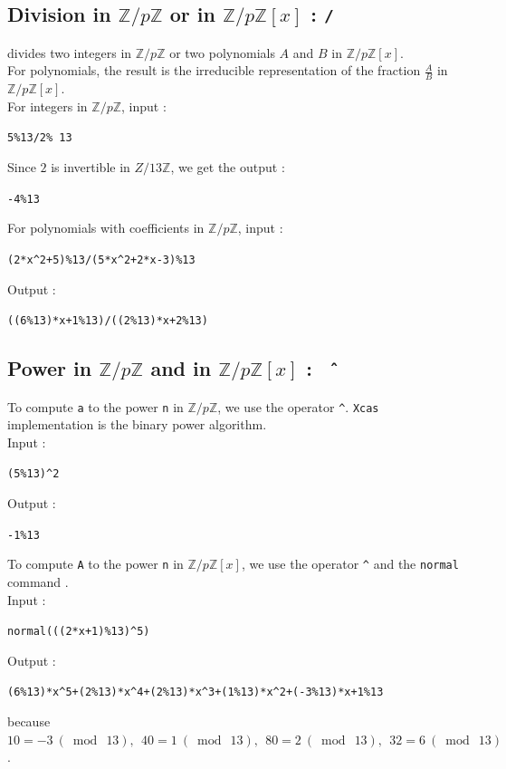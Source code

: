\documentclass[a4paper,11pt]{book}
\newcommand{\Z}{{\mathbb{Z}}}
\begin{document}
\subsection{Division in $\Z/p\Z$ or in $\Z/p\Z[x]$ : {\tt /}}\index{/}
\noindent{\tt /} divides two integers in $\Z/p\Z$ or 
two polynomials $A$ and $B$ in $\Z/p\Z[x]$.\\
For polynomials, the result is the irreducible representation
of the fraction $\frac{A}{B}$ in $\Z/p\Z[x]$.\\
For integers in $\Z/p\Z$, input :
\begin{center}{\tt 5\%13/2\% 13}\end{center}
Since $2$ is invertible in $Z/13\Z$, we get the output :
\begin{center}{\tt -4\%13}\end{center}
For polynomials with coefficients in $\Z/p\Z$, input :
\begin{center}{\tt (2*x\verb|^|2+5)\%13/(5*x\verb|^|2+2*x-3)\%13}\end{center}
Output :
\begin{center}{\tt ((6\%13)*x+1\%13)/((2\%13)*x+2\%13)}\end{center}

\subsection{Power in $\Z/p\Z$ and in $\Z/p\Z[x]$ : {\tt \^\ }}\index{\^\ }
To compute {\tt a} to the power {\tt n} in $\Z/p\Z$, we use the operator 
\verb|^|. {\tt Xcas} implementation is the binary power algorithm.\\
Input :
\begin{center}{\tt (5\%13)\verb|^|2}\end{center}
Output :
\begin{center}{\tt -1\%13}\end{center}
To compute {\tt A} to the power {\tt n} in $\Z/p\Z[x]$, we use the operator 
\verb|^| and the {\tt normal} command .\\
Input :
\begin{center}{\tt normal(((2*x+1)\%13)\verb|^|5)}\end{center}
Output :
\begin{center}{\tt (6\%13)*x\verb|^|5+(2\%13)*x\verb|^|4+(2\%13)*x\verb|^|3+(1\%13)*x\verb|^|2+(-3\%13)*x+1\%13}\end{center}
because
 $10=-3 \ (\bmod\ 13), \ \  40=1\ (\bmod\ 13),\ \   80=2 \ (\bmod\ 13),\ \ 32=6\ (\bmod\ 13)$. 
\end{document}

